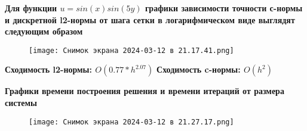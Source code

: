 \documentclass{beamer}
\begin{document}
\begin{frame}
\textbf{Для функции $u=sin(x)sin(5y)$ графики зависимости точности с-нормы и дискретной l2-нормы от шага сетки в логарифмическом виде выглядят следующим образом}

\begin{figure}
    \centering
    \texttt{[image: Снимок экрана 2024-03-12 в 21.17.41.png]}
\end{figure}
\textbf{Сходимость l2-нормы: $O(0.77 * h^{2.07})$}    
\newline
\textbf{Сходимость c-нормы: $O(h^{2})$} 
\end{frame}

\begin{frame}
\textbf{Графики времени построения решения и времени
итераций от размера системы}  
\begin{figure}
    \centering
    \texttt{[image: Снимок экрана 2024-03-12 в 21.27.17.png]}
\end{figure}
\end{frame}
\end{document}

